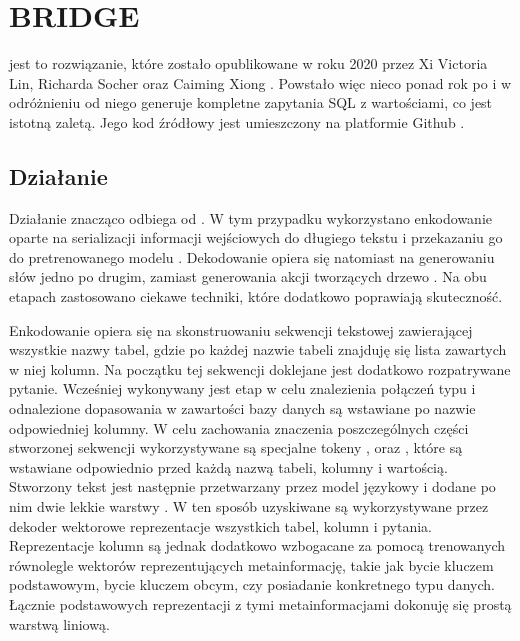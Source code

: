 \section{BRIDGE}
 jest to rozwiązanie, które zostało opublikowane w roku 2020 przez Xi Victoria Lin, Richarda Socher oraz Caiming Xiong . Powstało więc nieco ponad rok po  i w odróżnieniu od niego generuje kompletne zapytania SQL z wartościami, co jest istotną zaletą. Jego kod źródłowy jest umieszczony na platformie Github .

\subsection{Działanie}
Działanie  znacząco odbiega od . W tym przypadku wykorzystano enkodowanie oparte na serializacji informacji wejściowych do długiego tekstu i przekazaniu go do pretrenowanego modelu . Dekodowanie opiera się natomiast na generowaniu słów jedno po drugim, zamiast generowania akcji tworzących drzewo . Na obu etapach zastosowano ciekawe techniki, które dodatkowo poprawiają skuteczność.

Enkodowanie opiera się na skonstruowaniu sekwencji tekstowej zawierającej wszystkie nazwy tabel, gdzie po każdej nazwie tabeli znajduję się lista zawartych w niej kolumn. Na początku tej sekwencji doklejane jest dodatkowo rozpatrywane pytanie. Wcześniej wykonywany jest etap  w celu znalezienia połączeń typu  i odnalezione dopasowania w zawartości bazy danych są  wstawiane po nazwie odpowiedniej kolumny. W celu zachowania znaczenia poszczególnych części stworzonej sekwencji wykorzystywane są specjalne tokeny \code{[T]}, \code{[C]} oraz \code{[V]}, które są wstawiane odpowiednio przed każdą nazwą tabeli, kolumny i wartością. Stworzony tekst jest następnie przetwarzany przez model językowy  i dodane po nim dwie lekkie warstwy . W ten sposób uzyskiwane są wykorzystywane przez dekoder wektorowe reprezentacje wszystkich tabel, kolumn i pytania. Reprezentacje kolumn są jednak dodatkowo wzbogacane za pomocą trenowanych równolegle wektorów reprezentujących metainformację, takie jak bycie kluczem podstawowym, bycie kluczem obcym, czy posiadanie konkretnego typu danych. Łącznie podstawowych reprezentacji z tymi metainformacjami dokonuję się prostą warstwą liniową.

